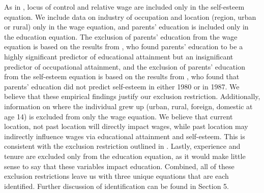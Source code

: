 \documentclass[12pt]{report}
\newcommand{\citee}[1]{\citename{#1} \citeyear{#1}}
\begin{document}
As in \citee{GVD1997}, locus of control and relative wage are included only in the self-esteem equation. We include data on industry of occupation and location (region, urban or rural) only in the wage equation, and parents' education is included only in the education equation. The exclusion of parents' education from the wage equation is based on the results from \citee{W1999}, who found parents' education to be a highly significant predictor of educational attainment but an insignificant predictor of occupational attainment, and the exclusion of parents' education from the self-esteem equation is based on the results from \citee{GVD1997}, who found that parents' education did not predict self-esteem in either 1980 or in 1987. We believe that these empirical findings justify our exclusion restriction. Additionally, information on where the individual grew up (urban, rural, foreign, domestic at age 14) is excluded from only the wage equation. We believe that current location, not past location will directly impact wages, while past location may indirectly influence wages via educational attainment and self-esteem. This is consistent with the exclusion restriction outlined in \citee{HSU2006}. Lastly, experience and tenure are excluded only from the education equation, as it would make little sense to say that these variables impact education. Combined, all of these exclusion restrictions leave us with three unique equations that are each identified. Further discussion of identification can be found in Section 5.
\end{document}
